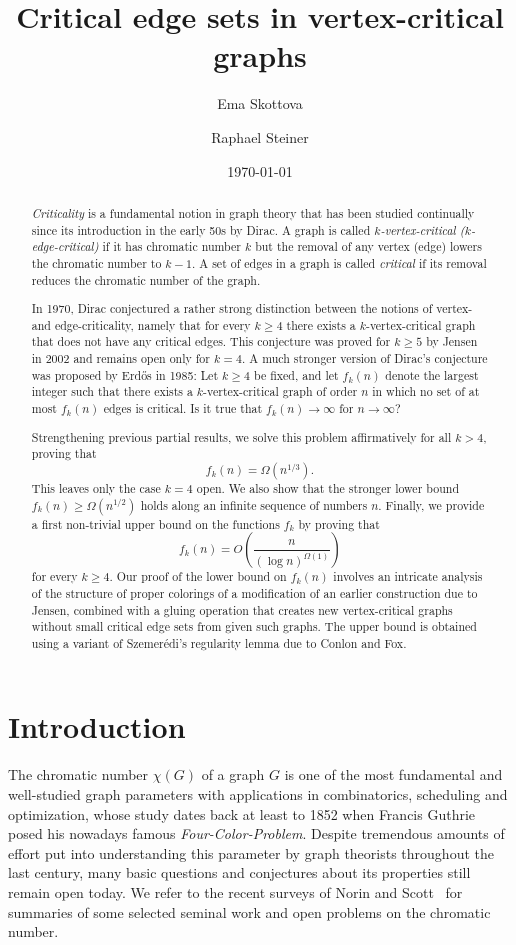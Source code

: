 \documentclass[a4paper,10pt,hidelinks]{amsart}
\author
{
Ema Skottova
}
\author
{
Raphael Steiner
}
\date{\today}
\title{Critical edge sets in vertex-critical graphs}
\theoremstyle{definition}
\begin{document}
\maketitle

\begin{abstract}
\emph{Criticality} is a fundamental notion in graph theory that has been studied continually since its introduction in the early 50s by Dirac. A graph is called \emph{$k$-vertex-critical ($k$-edge-critical)} if it has chromatic number $k$ but the removal of any vertex (edge) lowers the chromatic number to $k-1$. A set of edges in a graph is called \emph{critical} if its removal reduces the chromatic number of the graph.

In 1970, Dirac conjectured a rather strong distinction between the notions of vertex- and edge-criticality, namely that for every $k\ge 4$ there exists a $k$-vertex-critical graph that does not have any critical edges. This conjecture was proved for $k\ge 5$ by Jensen in 2002 and remains open only for $k=4$. A much stronger version of Dirac's conjecture was proposed by Erd\H{o}s in 1985: Let $k\ge 4$ be fixed, and let $f_k(n)$ denote the largest integer such that there exists a $k$-vertex-critical graph of order $n$ in which no set of at most $f_k(n)$ edges is critical. Is it true that $f_k(n)\rightarrow \infty$ for $n\rightarrow \infty$?

Strengthening previous partial results, we solve this problem affirmatively for all $k>4$, proving that $$f_k(n)=\Omega(n^{1/3}).$$ This leaves only the case $k=4$ open. We also show that the stronger lower bound $f_k(n)\ge \Omega(n^{1/2})$ holds along an infinite sequence of numbers $n$. Finally, we provide a first non-trivial upper bound on the functions $f_k$ by proving that $$f_k(n)=O\left(\frac{n}{(\log n)^{\Omega(1)}}\right)$$ for every $k\ge 4$. Our proof of the lower bound on $f_k(n)$ involves an intricate analysis of the structure of proper colorings of a modification of an earlier construction due to Jensen, combined with a gluing operation that creates new vertex-critical graphs without small critical edge sets from given such graphs. The upper bound is obtained using a variant of Szemer\'{e}di's regularity lemma due to Conlon and Fox. \end{abstract}

\section{Introduction}
The chromatic number $\chi(G)$ of a graph $G$ is one of the most fundamental and well-studied graph parameters with applications in combinatorics, scheduling and optimization, whose study dates back at least to 1852 when Francis Guthrie posed his nowadays famous \emph{Four-Color-Problem}. Despite tremendous amounts of effort put into understanding this parameter by graph theorists throughout the last century, many basic questions and conjectures about its properties still remain open today. We refer to the recent surveys of Norin and Scott~\cite{norin,scott} for summaries of some selected seminal work and open problems on the chromatic number. 
\end{document}
